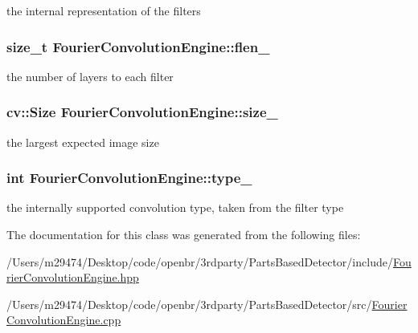the internal representation of the filters 

\hypertarget{class_fourier_convolution_engine_ab4322f51ce4a18ab5b7439abb5c96aef}{
\subsubsection[{flen\-\_\-}]{\setlength{\rightskip}{0pt plus 5cm}size\-\_\-t Fourier\-Convolution\-Engine\-::flen\-\_\-\hspace{0.3cm}{\ttfamily [private]}}}\label{class_fourier_convolution_engine_ab4322f51ce4a18ab5b7439abb5c96aef}


the number of layers to each filter 

\hypertarget{class_fourier_convolution_engine_a2375ea1729ad2fe45fe6204130f3f39f}{
\subsubsection[{size\-\_\-}]{\setlength{\rightskip}{0pt plus 5cm}cv\-::\-Size Fourier\-Convolution\-Engine\-::size\-\_\-\hspace{0.3cm}{\ttfamily [private]}}}\label{class_fourier_convolution_engine_a2375ea1729ad2fe45fe6204130f3f39f}


the largest expected image size 

\hypertarget{class_fourier_convolution_engine_a3e213d98d690b295eaa2866618f17933}{
\subsubsection[{type\-\_\-}]{\setlength{\rightskip}{0pt plus 5cm}int Fourier\-Convolution\-Engine\-::type\-\_\-\hspace{0.3cm}{\ttfamily [private]}}}\label{class_fourier_convolution_engine_a3e213d98d690b295eaa2866618f17933}


the internally supported convolution type, taken from the filter type 



The documentation for this class was generated from the following files\-:\begin{DoxyCompactItemize}
\item 
/\-Users/m29474/\-Desktop/code/openbr/3rdparty/\-Parts\-Based\-Detector/include/\hyperlink{_fourier_convolution_engine_8hpp}{Fourier\-Convolution\-Engine.\-hpp}\item 
/\-Users/m29474/\-Desktop/code/openbr/3rdparty/\-Parts\-Based\-Detector/src/\hyperlink{_fourier_convolution_engine_8cpp}{Fourier\-Convolution\-Engine.\-cpp}\end{DoxyCompactItemize}
